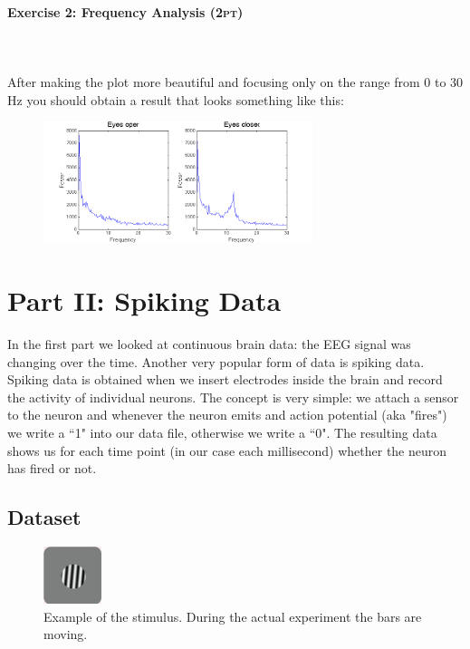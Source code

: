 \documentclass[a4paper,11pt]{article}
\newenvironment{exercise}[3]{\paragraph{Exercise #1: #2 \textsc{(#3pt)}}\ \\}{
\medskip}
\begin{document}
\begin{exercise}{2}{Frequency Analysis}{2}
\ \\
After making the plot more beautiful and focusing only on the range from 0 to 30 Hz you should obtain a result that looks something like this:
\begin{figure}[H]
   \centering
   \includegraphics[width=0.7\textwidth]{fouriereyes.png} 
\end{figure}
\end{exercise}

\section{Part II: Spiking Data}
In the first part we looked at continuous brain data: the EEG signal was changing over the time. Another very popular form of data is spiking data. Spiking data is obtained when we insert electrodes inside the brain and record the activity of individual neurons. The concept is very simple: we attach a sensor to the neuron and whenever the neuron emits and action potential (aka "fires") we write a ``1" into our data file, otherwise we write a ``0". The resulting data shows us for each time point (in our case each millisecond) whether the neuron has fired or not.



\subsection{Dataset}

\begin{figure}
	\centering
	\vspace{-12pt}
	\includegraphics[width=0.15\textwidth]{orientationstimulus.jpg}
	\caption{Example of the stimulus. During the actual experiment the bars are moving.}
	\label{fig:stimulusexample}
	\vspace{-5pt}
\end{figure}
\end{document}

